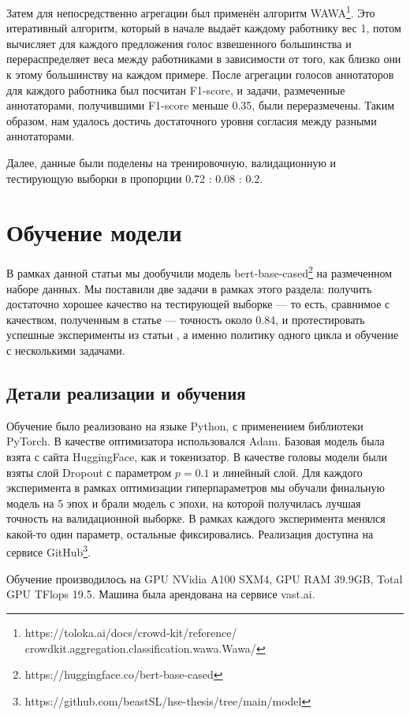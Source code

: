 \documentclass[a4paper,14pt]{extarticle}
\begin{document}
    Затем для непосредственно агрегации был применён алгоритм WAWA\footnote{https://toloka.ai/docs/crowd-kit/reference/\\crowdkit.aggregation.classification.wawa.Wawa/}. Это итеративный алгоритм, который в начале выдаёт каждому работнику вес 1, потом вычисляет для каждого предложения голос взвешенного большинства и перераспределяет веса между работниками в зависимости от того, как близко они к этому большинству на каждом примере. После агрегации голосов аннотаторов для каждого работника был посчитан F1-score, и задачи, размеченные аннотаторами, получившими F1-score меньше 0.35, были переразмечены. Таким образом, нам удалось достичь достаточного уровня согласия между разными аннотаторами.
    
    Далее, данные были поделены на тренировочную, валидационную и тестирующую выборки в пропорции 0.72 : 0.08 : 0.2.
    
    \section{Обучение модели}
    В рамках данной статьи мы дообучили модель bert-base-cased\footnote{https://huggingface.co/bert-base-cased} на размеченном наборе данных. Мы поставили две задачи в рамках этого раздела: получить достаточно хорошее качество на тестирующей выборке --- то есть, сравнимое с качеством, полученным в статье \cite{bert-finetune} --- точность около 0.84, и протестировать успешные эксперименты из статьи \cite{bert-finetune}, а именно политику одного цикла и обучение с несколькими задачами.
    
    \subsection{Детали реализации и обучения}
    Обучение было реализовано на языке Python, с применением библиотеки PyTorch. В качестве оптимизатора использовался Adam. Базовая модель была взята с сайта HuggingFace, как и токенизатор. В качестве головы модели были взяты слой Dropout с параметром $p=0.1$ и линейный слой. Для каждого эксперимента в рамках оптимизации гиперпараметров мы обучали финальную модель на 5 эпох и брали модель с эпохи, на которой получилась лучшая точность на валидационной выборке. В рамках каждого эксперимента менялся какой-то один параметр, остальные фиксировались. Реализация доступна на сервисе GitHub\footnote{https://github.com/beastSL/hse-thesis/tree/main/model}.
    
    Обучение производилось на GPU NVidia A100 SXM4, GPU RAM 39.9GB, Total GPU TFlops 19.5. Машина была арендована на сервисе vast.ai.
    
\end{document}
